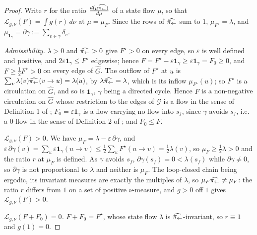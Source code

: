 \begin{proof}
Write $r$ for the ratio $\frac{d(\mu\widehat{\pi_{\leftarrow}})}{d\mu}$ of a state flow $\mu$, so that $\mathcal L_{g,\nu}(F)=\int g(r)\,d\nu$ at $\mu=\mu_F$. Since the rows of $\widehat{\pi_{\leftarrow}}$ sum to $1$, $\mu_{F^\star}=\lambda$, and $\mu_{\mathbf 1_\gamma}=\partial\gamma:=\sum_{v\in\gamma}\delta_v$.

\emph{Admissibility.} $\lambda>0$ and $\widehat{\pi_{\leftarrow}}>0$ give $F^\star>0$ on every edge, so $\varepsilon$ is well defined and positive, and $2\varepsilon\mathbf 1_\gamma\leq F^\star$ edgewise; hence $F=F^\star-\varepsilon\mathbf 1_\gamma\geq\varepsilon\mathbf 1_\gamma=F_0\geq0$, and $F\geq\frac12F^\star>0$ on every edge of $\widehat G$. The outflow of $F^\star$ at $u$ is $\sum_v\lambda(v)\widehat{\pi_{\leftarrow}}(v\rightarrow u)=\lambda(u)$, by $\lambda\widehat{\pi_{\leftarrow}}=\lambda$, which is its inflow $\mu_{F^\star}(u)$; so $F^\star$ is a circulation on $\widehat G$, and so is $\mathbf 1_\gamma$, $\gamma$ being a directed cycle. Hence $F$ is a non-negative circulation on $\widehat G$ whose restriction to the edges of $\mathcal G$ is a flow in the sense of Definition 1 of \citet{brunswic2024theory}; $F_0=\varepsilon\mathbf 1_\gamma$ is a flow carrying no flow into $s_f$, since $\gamma$ avoids $s_f$, i.e. a $0$-flow in the sense of Definition 2 of \citet{brunswic2024theory}; and $F_0\leq F$.

\emph{$\mathcal L_{g,\nu}(F)>0$.} We have $\mu_F=\lambda-\varepsilon\,\partial\gamma$, and $\varepsilon\,\partial\gamma(v)=\sum_u\varepsilon\mathbf 1_\gamma(u\rightarrow v)\leq\frac12\sum_uF^\star(u\rightarrow v)=\frac12\lambda(v)$, so $\mu_F\geq\frac12\lambda>0$ and the ratio $r$ at $\mu_F$ is defined. As $\gamma$ avoids $s_f$, $\partial\gamma(s_f)=0<\lambda(s_f)$ while $\partial\gamma\neq0$, so $\partial\gamma$ is not proportional to $\lambda$ and neither is $\mu_F$. The loop-closed chain being ergodic, its invariant measures are exactly the multiples of $\lambda$, so $\mu_F\widehat{\pi_{\leftarrow}}\neq\mu_F$: the ratio $r$ differs from $1$ on a set of positive $\nu$-measure, and $g>0$ off $1$ gives $\mathcal L_{g,\nu}(F)>0$.

\emph{$\mathcal L_{g,\nu}(F+F_0)=0$.} $F+F_0=F^\star$, whose state flow $\lambda$ is $\widehat{\pi_{\leftarrow}}$-invariant, so $r\equiv1$ and $g(1)=0$.


\end{proof}
